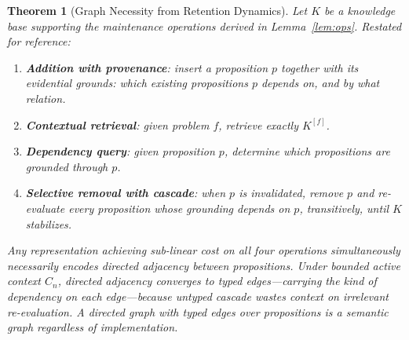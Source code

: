 \documentclass[11pt]{article}
\newtheorem{theorem}{Theorem}
\theoremstyle{definition}
\begin{document}
\begin{theorem}[Graph Necessity from Retention Dynamics]
\label{thm:graph-dynamics}
Let $K$ be a knowledge base supporting the maintenance operations
derived in Lemma~\ref{lem:ops}. Restated for reference:
\begin{enumerate}
\item[(i)] \textbf{Addition with provenance}: insert a proposition $p$
   together with its evidential grounds: which existing propositions
   $p$ depends on, and by what relation.
\item[(ii)] \textbf{Contextual retrieval}: given problem $f$, retrieve
   exactly $K^{[f]}$.
\item[(iii)] \textbf{Dependency query}: given proposition $p$, determine
   which propositions are grounded through $p$.
\item[(iv)] \textbf{Selective removal with cascade}: when $p$ is
   invalidated, remove $p$ and re-evaluate every proposition whose
   grounding depends on $p$, transitively, until $K$ stabilizes.
\end{enumerate}
Any representation achieving sub-linear cost on all four operations
simultaneously necessarily encodes directed adjacency between
propositions. Under bounded active context $C_n$, directed adjacency
converges to typed edges---carrying the kind of dependency on each
edge---because untyped cascade wastes context on irrelevant
re-evaluation. A directed graph with typed edges over propositions is
a semantic graph regardless of implementation.
\end{theorem}
\end{document}
